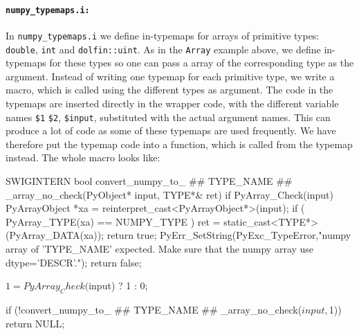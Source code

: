 \begin{code}
\paragraph{\texttt{numpy\_typemaps.i:}}
In \texttt{numpy\_typemaps.i} we define in-typemaps for arrays of primitive types: \texttt{double}, \texttt{int} and \texttt{dolfin::uint}. As in the \texttt{Array} example above, we define in-typemaps for these types so one can pass a \numpy array of the corresponding type as the argument. Instead of writing one typemap for each primitive type, we write a \swig macro, which is called using the different types as argument. The code in the typemaps are inserted directly in the wrapper code, with the different variable names \texttt{\$1} \texttt{\$2}, \texttt{\$input}, substituted with the actual argument names. This can produce a lot of code as some of these typemaps are used frequently. We have therefore put the typemap code into a function, which is called from the typemap instead. The whole macro looks like:
\begin{code}
SWIGINTERN bool convert_numpy_to_ ## TYPE_NAME ## _array_no_check(PyObject* input, TYPE*& ret)
{
  if PyArray_Check(input)
  {
    PyArrayObject *xa = reinterpret_cast<PyArrayObject*>(input);
    if ( PyArray_TYPE(xa) == NUMPY_TYPE )
    {
      ret  = static_cast<TYPE*>(PyArray_DATA(xa));
      return true;
    }
  }
  PyErr_SetString(PyExc_TypeError,"numpy array of 'TYPE_NAME' expected. Make sure that the numpy array use dtype='DESCR'.");
  return false;
}

{
    $1 = PyArray_Check($input) ? 1 : 0;
}

{
if (!convert_numpy_to_ ## TYPE_NAME ## _array_no_check($input,$1))
    return NULL;
}


\end{code}
\end{code}
